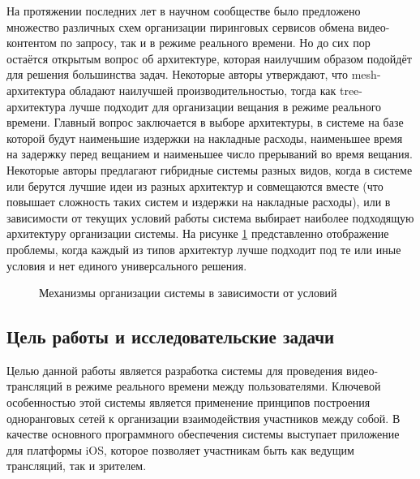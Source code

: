 	На протяжении последних лет в научном сообществе было предложено множество различных схем организации пиринговых
	сервисов обмена видео-контентом по запросу, так и в режиме реального времени. Но до сих пор остаётся открытым вопрос
	об архитектуре, которая наилучшим образом подойдёт для решения большинства задач. Некоторые авторы утверждают, что
	mesh-архитектура обладают наилучшей производительностью, тогда как tree-архитектура лучше подходит для организации
	вещания в режиме реального времени. Главный вопрос заключается в выборе архитектуры, в системе на базе которой будут
	наименьшие издержки на накладные расходы, наименьшее время на задержку перед вещанием и наименьшее число прерываний
	во время вещания. Некоторые авторы предлагают гибридные системы разных видов, когда в системе или берутся лучшие
	идеи из разных архитектур и совмещаются вместе (что повышает сложность таких систем и издержки на накладные расходы),
	или в зависимости от текущих условий работы система выбирает наиболее подходящую архитектуру организации системы.
	На рисунке \ref{img:p2p-mechanisms} представленно отображение проблемы, когда каждый из типов архитектур лучше
	подходит под те или иные условия и нет единого универсального решения.

	\begin{figure}[h]
		\caption{Механизмы организации системы в зависимости от условий}
		\label{img:p2p-mechanisms}
	\end{figure}

	\subsection{Цель работы и исследовательские задачи}
	Целью данной работы является разработка системы для проведения видео-трансляций в режиме реального времени между
	пользователями. Ключевой особенностью этой системы является применение принципов построения одноранговых сетей к
	организации взаимодействия участников между собой. В качестве основного программного обеспечения системы выступает
	приложение для платформы iOS, которое позволяет участникам быть как ведущим трансляций, так и зрителем.

